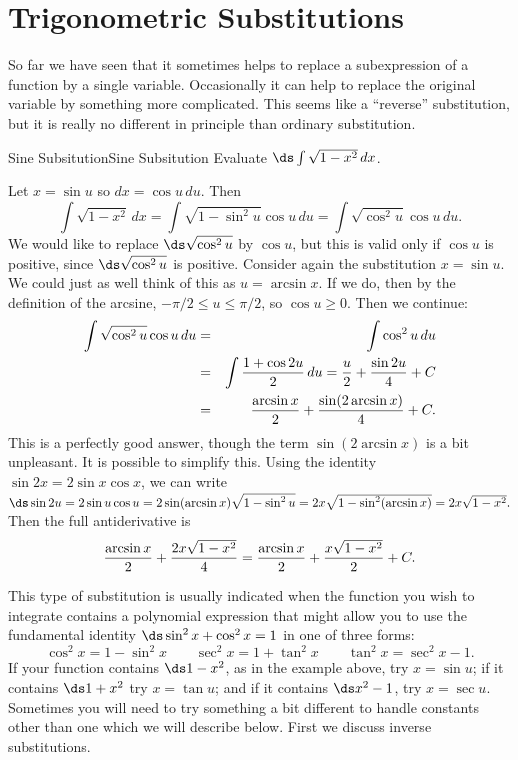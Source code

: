 \section{Trigonometric Substitutions}{}{}\label{sec:Trig Sub}
So far we have seen that it sometimes helps to replace a subexpression
of a function by a single variable. Occasionally it can help to
replace the original variable by something more complicated. This
seems like a ``reverse'' substitution, but it is really no different
in principle than ordinary substitution.

\begin{example}{Sine Subsitution}{Sine Subsitution}
Evaluate $\ds\int \sqrt{1-x^2}\,dx$. 
\end{example}

\begin{solution}
Let $x=\sin u$ so 
$dx=\cos u\,du$. Then
$$
  \int \sqrt{1-x^2}\,dx=\int\sqrt{1-\sin^2 u}\cos u\,du=
  \int\sqrt{\cos^2 u}\cos u\,du.
$$
We would like to replace $\ds \sqrt{\cos^2 u}$ by $\cos u$, but this is
valid only if $\cos u $ is positive, since $\ds \sqrt{\cos^2 u}$ is
positive. Consider again the substitution $x=\sin u$. We could just as
well think of this as $u=\arcsin x$. If we do, then by the definition
of the arcsine, $-\pi/2\le u\le\pi/2$, so $\cos u\ge0$. Then we
continue:
\begin{eqnarray*}
  \int\sqrt{\cos^2 u}\cos u\,du&=&\int\cos^2u\,du\\
	&=&\int {1+\cos 2u\over2}\,du = {u\over 2}+{\sin 2u\over4}+C\cr
  &=&{\arcsin x\over2}+{\sin(2\arcsin x)\over4}+C.
\end{eqnarray*}
This is a perfectly good answer, though the term
$\sin(2\arcsin x)$ is a bit unpleasant. It is possible to simplify
this. Using the identity $\sin 2x=2\sin x\cos x$, we can write
$\ds \sin 2u=2\sin u\cos u=2\sin(\arcsin x)\sqrt{1-\sin^2 u}=
2x\sqrt{1-\sin^2(\arcsin x)}=2x\sqrt{1-x^2}.$ Then the full
antiderivative is 
$$
  {\arcsin x\over2}+{2x\sqrt{1-x^2}\over4}=
  {\arcsin x\over2}+{x\sqrt{1-x^2}\over2}+C.
$$
\end{solution}

This type of substitution is usually indicated when the function you
wish to integrate contains a polynomial expression that might allow
you to use the fundamental identity $\ds \sin^2x+\cos^2x=1$ in
one of three forms:
$$
  \cos^2 x=1-\sin^2x
  \qquad
  \sec^2x=1+\tan^2x
  \qquad
  \tan^2x=\sec^2x-1.
$$
If your function contains $\ds 1-x^2$, as in the example above, try
$x=\sin u$; if it contains $\ds 1+x^2$ try $x=\tan u$; and if it contains
$\ds x^2-1$, try $x=\sec u$. Sometimes you will need to try something a
bit different to handle constants other than one which we will describe below.
First we discuss inverse substitutions.


